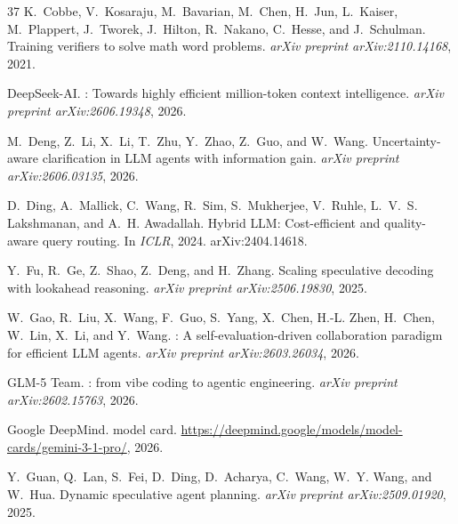 \documentclass[11pt, copyright, logo, secondlogo]{template/lark}
\begin{document}
\begin{thebibliography}{37}
K.~Cobbe, V.~Kosaraju, M.~Bavarian, M.~Chen, H.~Jun, L.~Kaiser, M.~Plappert,
  J.~Tworek, J.~Hilton, R.~Nakano, C.~Hesse, and J.~Schulman.
\newblock Training verifiers to solve math word problems.
\newblock \emph{arXiv preprint arXiv:2110.14168}, 2021.

{DeepSeek-AI}.
: Towards highly efficient million-token context
  intelligence.
\newblock \emph{arXiv preprint arXiv:2606.19348}, 2026.

M.~Deng, Z.~Li, X.~Li, T.~Zhu, Y.~Zhao, Z.~Guo, and W.~Wang.
\newblock Uncertainty-aware clarification in {LLM} agents with information
  gain.
\newblock \emph{arXiv preprint arXiv:2606.03135}, 2026.

D.~Ding, A.~Mallick, C.~Wang, R.~Sim, S.~Mukherjee, V.~Ruhle, L.~V.~S.
  Lakshmanan, and A.~H. Awadallah.
\newblock Hybrid {LLM}: Cost-efficient and quality-aware query routing.
\newblock In \emph{ICLR}, 2024.
\newblock arXiv:2404.14618.

Y.~Fu, R.~Ge, Z.~Shao, Z.~Deng, and H.~Zhang.
\newblock Scaling speculative decoding with lookahead reasoning.
\newblock \emph{arXiv preprint arXiv:2506.19830}, 2025.

W.~Gao, R.~Liu, X.~Wang, F.~Guo, S.~Yang, X.~Chen, H.-L. Zhen, H.~Chen, W.~Lin,
  X.~Li, and Y.~Wang.
: A self-evaluation-driven collaboration paradigm for
  efficient {LLM} agents.
\newblock \emph{arXiv preprint arXiv:2603.26034}, 2026.

{GLM-5 Team}.
: from vibe coding to agentic engineering.
\newblock \emph{arXiv preprint arXiv:2602.15763}, 2026.

{Google DeepMind}.
 model card.
\newblock \url{https://deepmind.google/models/model-cards/gemini-3-1-pro/},
  2026.

Y.~Guan, Q.~Lan, S.~Fei, D.~Ding, D.~Acharya, C.~Wang, W.~Y. Wang, and W.~Hua.
\newblock Dynamic speculative agent planning.
\newblock \emph{arXiv preprint arXiv:2509.01920}, 2025.


\end{thebibliography}
\end{document}

